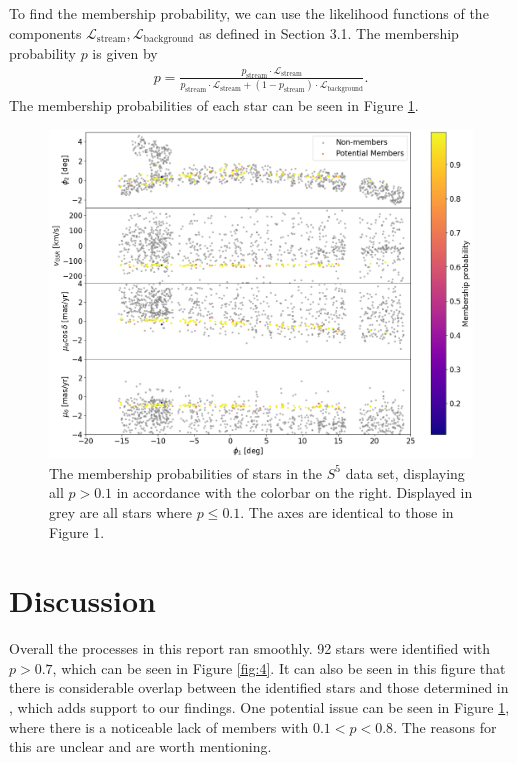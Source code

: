 \documentclass{article}
\begin{document}
To find the membership probability, we can use the likelihood functions of the components $\mathcal{L}_\text{stream},\mathcal{L}_\text{background}$ as defined in Section 3.1. The membership probability $p$ is given by
\begin{align}
    p=\frac{p_\text{stream}\cdot\mathcal{L}_\text{stream}}{p_\text{stream}\cdot\mathcal{L}_\text{stream}+(1-p_\text{stream})\cdot\mathcal{L}_\text{background}}.
\end{align}
The membership probabilities of each star can be seen in Figure \ref{fig:3}.
\begin{figure}[H]
\begin{center}
    \includegraphics[width=\textwidth]{figures/fig 3.png}
\end{center}
    \vspace{-2em}
    \caption{The membership probabilities of stars in the $S^5$ data set, displaying all $p>0.1$ in accordance with the colorbar on the right. Displayed in grey are all stars where $p\leq0.1$. The axes are identical to those in Figure 1.}
    \label{fig:3}
\end{figure}

\pagebreak

\section{Discussion}

Overall the processes in this report ran smoothly. 92 stars were identified with $p>0.7$, which can be seen in Figure \ref{fig:4}. It can also be seen in this figure that there is considerable overlap between the identified stars and those determined in \citet{2021ApJ...911..149L}, which adds support to our findings. One potential issue can be seen in Figure \ref{fig:3}, where there is a noticeable lack of members with $0.1<p<0.8$. The reasons for this are unclear and are worth mentioning.\\
\end{document}
